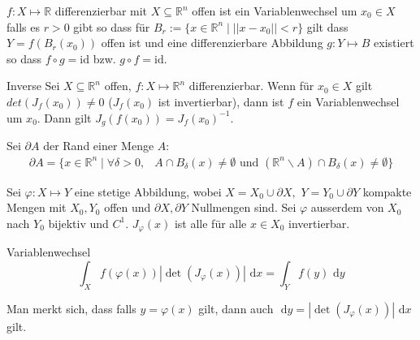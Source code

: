 \documentclass[a4paper,10pt]{article}
\def\R{\mathbb{R}}
\def\dx{\text{ d}x}
\def\dy{\text{ d}y}
\begin{document}
$f: X \mapsto \R$ differenzierbar mit $X \subseteq \R^n$ offen ist ein Variablenwechsel um $x_0 \in X$ falls es $r > 0$ gibt so dass für $B_r := \{x \in \R^n \mid ||x-x_0|| < r \}$ gilt dass $Y = f(B_r(x_0))$ offen ist und eine differenzierbare Abbildung $g: Y \mapsto B$ existiert so dass $f \circ g = \mathrm{id}$ bzw. $g \circ f = \mathrm{id}$.

\begin{subbox}{Inverse}
  Sei $X \subseteq \R^n$ offen, $f: X \mapsto \R^n$ differenzierbar. Wenn für $x_0 \in X$ gilt $det(J_f(x_0)) \neq 0$ ($J_f(x_0)$ ist invertierbar), dann ist $f$ ein Variablenwechsel um $x_0$. Dann gilt $J_g(f(x_0)) = J_f(x_0)^{-1}$.
\end{subbox}

Sei \(\partial A\) der Rand einer Menge \(A\):
\begin{align*}
    \partial A = \Big\{ x \in \R^n \mid \forall \delta > 0, &A \cap B_\delta(x) \neq \emptyset \text{ und } (\R^n \backslash A) \cap B_\delta(x) \neq \emptyset \Big\}
\end{align*}

Sei \(\varphi : X \mapsto Y\) eine stetige Abbildung, wobei \(X=  X_0 \cup \partial X, \) \(Y = Y_0 \cup \partial Y\) kompakte Mengen mit \(X_0, Y_0\) offen und \(\partial X, \partial Y\) Nullmengen sind. Sei $\varphi$ ausserdem von $X_0$ nach $Y_0$ bijektiv und $C^1$. $J_\varphi(x)$ ist alle für alle $x \in X_0$ invertierbar.

\begin{mainbox}{Variablenwechsel}
  $$\int_X f(\varphi(x)) | \det(J_\varphi(x)) | \dx = \int_Y f(y) \dy$$
\end{mainbox}

Man merkt sich, dass falls $y = \varphi(x)$ gilt, dann auch $\dy = | \det(J_\varphi(x)) | \dx$ gilt.
\end{document}
